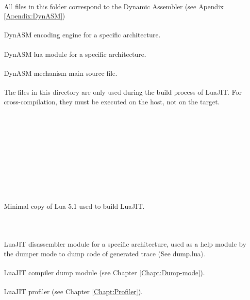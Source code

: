\\
All files in this folder correspond to the Dynamic Assembler (see Apendix \ref{Apendix:DynASM})\\
\\
DynASM encoding engine for a specific architecture.\\
\\{}
DynASM lua module for a specific architecture.\\
\\
DynASM mechanism main source file.\\
\\
The files in this directory are only used during the build process of LuaJIT.
For cross-compilation, they must be executed on the host, not on the target.\\
\\
\\
\\
\\
\\
\\
\\
\\
\\
\\
Minimal copy of Lua 5.1 used to build LuaJIT.\\
\\
\\{}
\\
LuaJIT disassembler module for a specific architecture, used as a help module by
the dumper mode to dump code of generated trace (See dump.lua).\\
\\
LuaJIT compiler dump module (see Chapter \ref{Chapt:Dump-mode}).\\
\\
LuaJIT profiler (see Chapter \ref{Chapt:Profiler}).\\
\\
